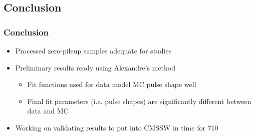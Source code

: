 \documentclass[bigger]{beamer}
\begin{document}
\subsection{Conclusion}
\label{sec-4-1}
\begin{frame}
\frametitle{Conclusion}
\label{sec-4-1-1}
\begin{itemize}

\item Processed zero-pileup samples adequate for studies
\label{sec-4-1-1-1}%

\item Preliminary results ready using Alexandre's method
\label{sec-4-1-1-2}%
\begin{itemize}

\item Fit functions used for data model MC pulse shape well
\label{sec-4-1-1-2-1}%

\item Final fit parameters (i.e. pulse shapes) are significantly different between data and MC
\label{sec-4-1-1-2-2}%
\end{itemize} %

\item Working on validating results to put into CMSSW in time for 710
\label{sec-4-1-1-3}%
\end{itemize} %
\end{frame}
\end{document}

